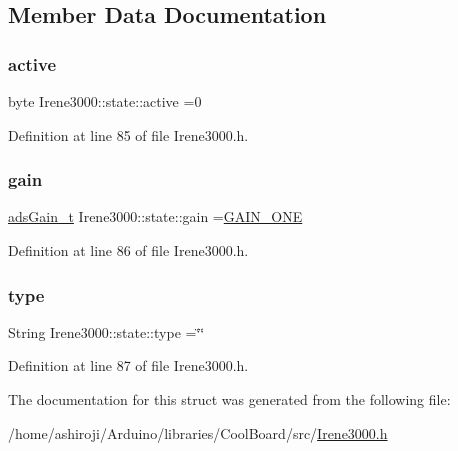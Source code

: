 \subsection{Member Data Documentation}
\mbox{\label{struct_irene3000_1_1state_af7ff649f20b9a2fb6ca0f949ee9a25ce}} 
\subsubsection{\texorpdfstring{active}{active}}
{\footnotesize\ttfamily byte Irene3000\+::state\+::active =0}



Definition at line 85 of file Irene3000.\+h.

\mbox{\label{struct_irene3000_1_1state_a1ecf69d38cb31ecaf6b3602a3f3e93cb}} 
\subsubsection{\texorpdfstring{gain}{gain}}
{\footnotesize\ttfamily \hyperlink{_cool_adafruit___a_d_s1015_8h_a3d6c0e15829a207b9155890811fa4781}{ads\+Gain\+\_\+t} Irene3000\+::state\+::gain =\hyperlink{_cool_adafruit___a_d_s1015_8h_a3d6c0e15829a207b9155890811fa4781ab6b0b520637e016e297110bebeb23a54}{G\+A\+I\+N\+\_\+\+O\+NE}}



Definition at line 86 of file Irene3000.\+h.

\mbox{\label{struct_irene3000_1_1state_a9897a7e02727db6351d44006eec73799}} 
\subsubsection{\texorpdfstring{type}{type}}
{\footnotesize\ttfamily String Irene3000\+::state\+::type =\char`\"{}\char`\"{}}



Definition at line 87 of file Irene3000.\+h.



The documentation for this struct was generated from the following file\+:\begin{DoxyCompactItemize}
\item 
/home/ashiroji/\+Arduino/libraries/\+Cool\+Board/src/\hyperlink{_irene3000_8h}{Irene3000.\+h}\end{DoxyCompactItemize}
